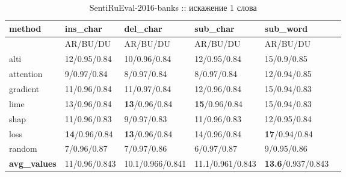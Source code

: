 \begin{enumerate}
\end{enumerate}


\begin{table}[H]
  \centering
  \caption*{SentiRuEval-2016-banks :: искажение 1 слова}
  {\renewcommand{\arraystretch}{1.5}
  {\fontsize{11pt}{10pt}\selectfont
  \begin{tabularx}{\textwidth}{|l|X|X|X|X|X|}
    \hline
     method    & ins\_char         & del\_char         & sub\_char         & sub\_word         \\
    \hline
     & AR/BU/DU  & AR/BU/DU  & AR/BU/DU  & AR/BU/DU \\
    \hline
     alti      & 12/0.95/0.84 & 10/0.96/0.84 & 12/0.95/0.84 & 15/0.9/0.85 \\
    \hline
     attention & 9/0.97/0.84  & 8/0.97/0.84  & 8/0.97/0.84  & 12/0.94/0.85 \\
    \hline
     gradient  & 11/0.96/0.84 & 11/0.97/0.84 & 12/0.96/0.84 & 15/0.94/0.83 \\
    \hline
     lime      & 13/0.96/0.84 & \textbf{13}/0.96/0.84 & \textbf{15}/0.96/0.84 & 15/0.94/0.83 \\
    \hline
     shap      & 11/0.96/0.83 & 9/0.97/0.83  & 11/0.96/0.83 & 12/0.95/0.84 \\
    \hline
     loss      & \textbf{14}/0.96/0.84 & \textbf{13}/0.96/0.84 & 14/0.96/0.84 & \textbf{17}/0.94/0.84 \\
    \hline
     random    & 7/0.96/0.87  & 7/0.97/0.86  & 6/0.97/0.87  & 9/0.95/0.86 \\
    \hline
    \textbf{avg\_values} & 11/0.96/0.843  & 10.1/0.966/0.841  & 11.1/0.961/0.843  & \textbf{13.6}/0.937/0.843 \\
    \hline
    \end{tabularx}
    }
    }
\end{table}


